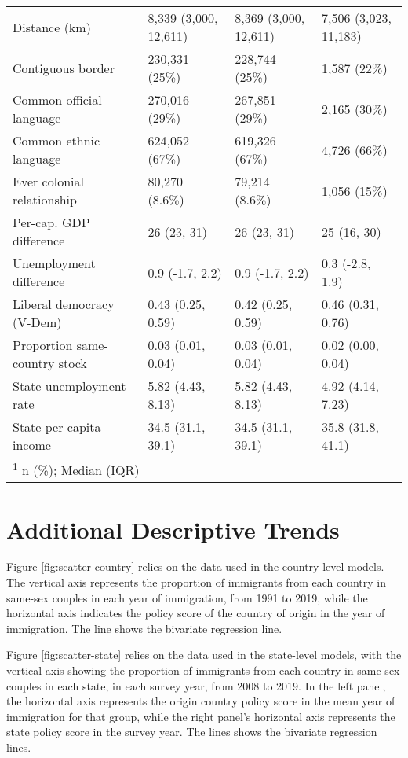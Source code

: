 \documentclass[
  11pt,
]{article}
\begin{document}
\begin{table}[!h]
\begin{tabular}[t]{llll}
Distance (km) & 8,339 (3,000, 12,611) & 8,369 (3,000, 12,611) & 7,506 (3,023, 11,183)\\
Contiguous border & 230,331 (25\%) & 228,744 (25\%) & 1,587 (22\%)\\
\addlinespace
Common official language & 270,016 (29\%) & 267,851 (29\%) & 2,165 (30\%)\\
Common ethnic language & 624,052 (67\%) & 619,326 (67\%) & 4,726 (66\%)\\
Ever colonial relationship & 80,270 (8.6\%) & 79,214 (8.6\%) & 1,056 (15\%)\\
Per-cap. GDP difference & 26 (23, 31) & 26 (23, 31) & 25 (16, 30)\\
Unemployment difference & 0.9 (-1.7, 2.2) & 0.9 (-1.7, 2.2) & 0.3 (-2.8, 1.9)\\
\addlinespace
Liberal democracy (V-Dem) & 0.43 (0.25, 0.59) & 0.42 (0.25, 0.59) & 0.46 (0.31, 0.76)\\
Proportion same-country stock & 0.03 (0.01, 0.04) & 0.03 (0.01, 0.04) & 0.02 (0.00, 0.04)\\
State unemployment rate & 5.82 (4.43, 8.13) & 5.82 (4.43, 8.13) & 4.92 (4.14, 7.23)\\
State per-capita income & 34.5 (31.1, 39.1) & 34.5 (31.1, 39.1) & 35.8 (31.8, 41.1)\\
\bottomrule
\multicolumn{4}{l}{\rule{0pt}{1em}\textsuperscript{1} n (\%); Median (IQR)}\\
\end{tabular}
\end{table}

\newpage

\hypertarget{additional-descriptive-trends}{%
\section{Additional Descriptive Trends}\label{additional-descriptive-trends}}

Figure \ref{fig:scatter-country} relies on the data used in the country-level models. The vertical axis represents the proportion of immigrants from each country in same-sex couples in each year of immigration, from 1991 to 2019, while the horizontal axis indicates the policy score of the country of origin in the year of immigration. The line shows the bivariate regression line.

Figure \ref{fig:scatter-state} relies on the data used in the state-level models, with the vertical axis showing the proportion of immigrants from each country in same-sex couples in each state, in each survey year, from 2008 to 2019. In the left panel, the horizontal axis represents the origin country policy score in the mean year of immigration for that group, while the right panel's horizontal axis represents the state policy score in the survey year. The lines shows the bivariate regression lines.
\end{document}
